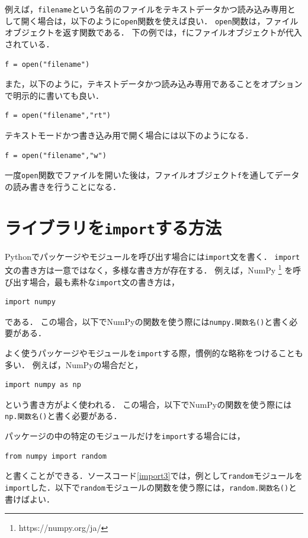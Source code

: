 \documentclass[a4paper,12pt]{jsarticle}
\begin{document}
例えば，\texttt{filename}という名前のファイルをテキストデータかつ読み込み専用として開く場合は，以下のように\texttt{open}関数を使えば良い．
\texttt{open}関数は，ファイルオブジェクトを返す関数である．
下の例では，\texttt{f}にファイルオブジェクトが代入されている．
\begin{lstlisting}[caption=テキストデータかつ読み込み専用で開く,label=open_default]
f = open("filename")
\end{lstlisting}
また，以下のように，テキストデータかつ読み込み専用であることをオプションで明示的に書いても良い．
\begin{lstlisting}[caption=テキストデータかつ読み込み専用で開く,label=open_rt]
f = open("filename","rt")
\end{lstlisting}
テキストモードかつ書き込み用で開く場合には以下のようになる．
\begin{lstlisting}[caption=テキストデータかつ書き込み専用で開く,label=open_w]
f = open("filename","w")
\end{lstlisting}

一度\texttt{open}関数でファイルを開いた後は，ファイルオブジェクト\texttt{f}を通してデータの読み書きを行うことになる．


\section{ライブラリを\texttt{import}する方法}

Pythonでパッケージやモジュールを呼び出す場合には\texttt{import}文を書く．
\texttt{import}文の書き方は一意ではなく，多様な書き方が存在する．
例えば，NumPy
\footnote{
https://numpy.org/ja/
}
を呼び出す場合，最も素朴な\texttt{import}文の書き方は，
\begin{lstlisting}[caption=NumPyを呼び出す方法,label=import1]
import numpy
\end{lstlisting}
である．
この場合，以下でNumPyの関数を使う際には\texttt{numpy.関数名()}と書く必要がある．

よく使うパッケージやモジュールを\texttt{import}する際，慣例的な略称をつけることも多い．
例えば，NumPyの場合だと，
\begin{lstlisting}[caption=NumPyを呼び出す方法,label=import2]
import numpy as np
\end{lstlisting}
という書き方がよく使われる．
この場合，以下でNumPyの関数を使う際には\texttt{np.関数名()}と書く必要がある．

パッケージの中の特定のモジュールだけを\texttt{import}する場合には，
\begin{lstlisting}[caption=NumPyを呼び出す方法,label=import3]
from numpy import random
\end{lstlisting}
と書くことができる．ソースコード\ref{import3}では，例として\texttt{random}モジュールを\texttt{import}した．以下で\texttt{random}モジュールの関数を使う際には，\texttt{random.関数名()}と書けばよい．
\end{document}
